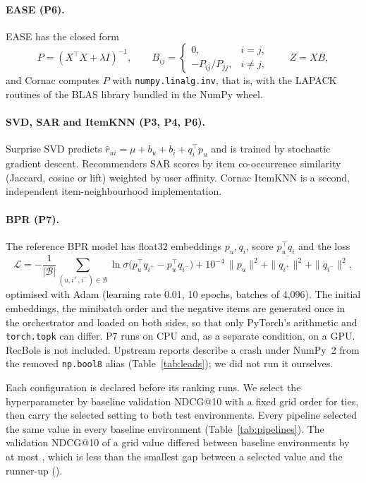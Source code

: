 \documentclass[11pt,a4paper]{article}
\newcommand{\T}{^{\top}}
\begin{document}
\paragraph{EASE (P6).} EASE \citep{steck2019ease} has the closed form
\begin{equation}
 P=(X\T X+\lambda I)^{-1},\qquad
 B_{ij}=\begin{cases}0,& i=j,\\ -P_{ij}/P_{jj},& i\neq j,\end{cases}\qquad
 Z=XB,
 \label{eq:ease}
\end{equation}
and Cornac computes $P$ with \texttt{numpy.linalg.inv}, that is, with the
LAPACK routines of the BLAS library bundled in the NumPy wheel.

\paragraph{SVD, SAR and ItemKNN (P3, P4, P6).} Surprise SVD predicts
$\hat r_{ui}=\mu+b_u+b_i+q_i\T p_u$ and is trained by stochastic gradient
descent. Recommenders SAR scores by item co-occurrence similarity (Jaccard,
cosine or lift) weighted by user affinity. Cornac ItemKNN is a second,
independent item-neighbourhood implementation.

\paragraph{BPR (P7).} The reference BPR model \citep{rendle2009bpr} has
float32 embeddings $p_u,q_i$, score $p_u\T q_i$ and the loss
\begin{equation}
 \mathcal{L}=-\frac{1}{|\mathcal B|}\sum_{(u,i^+,i^-)\in\mathcal B}
 \ln\sigma\bigl(p_u\T q_{i^+}-p_u\T q_{i^-}\bigr)
 +10^{-4}\,\overline{\|p_u\|^2+\|q_{i^+}\|^2+\|q_{i^-}\|^2},
 \label{eq:bpr}
\end{equation}
optimised with Adam (learning rate 0.01, 10 epochs, batches of 4{,}096). The
initial embeddings, the minibatch order and the negative items are generated
once in the orchestrator and loaded on both sides, so that only PyTorch's
arithmetic and \texttt{torch.topk} can differ. P7 runs on CPU and, as a
separate condition, on a GPU. RecBole is not included. Upstream reports
describe a crash under NumPy~2 from the removed \texttt{np.bool8} alias
(Table~\ref{tab:leads}); we did not run it ourselves.

Each configuration is declared before its ranking runs. We select the
hyperparameter by baseline validation NDCG@10 with a fixed grid order for
ties, then carry the selected setting to both test environments. Every
pipeline selected the same value in every baseline environment
(Table~\ref{tab:pipelines}). The validation NDCG@10 of a grid value differed
between baseline environments by at most \tuningSpread{}, which is less than
the smallest gap between a selected value and the runner-up (\tuningGap{}).
\end{document}
